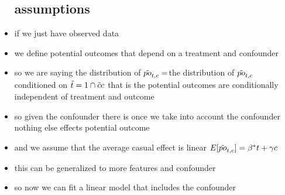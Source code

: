 \documentclass{article}
\begin{document}
\begin{itemize}
\subsection*{assumptions}
\item if we just have observed data 
\item we define potential outcomes that depend on a treatment and confounder 
\item so we are saying the distribution of $\Tilde{po}_{t,c}=$the distribution of $\Tilde{po}_{t,c}$ conditioned on $\Tilde{t}=1 \cap \Tilde{c}c$ 
that is the potential outcomes are conditionally independent of treatment and outcome 
\item so given the confounder there is once we take into account the confounder nothing else effects potential outcome
\item and we assume that the average casual effect is linear $E[\Tilde{po}_{t,c}]=\beta^{*}t+\gamma c$
\item this can be generalized to more features and confounder
\item so now we can fit a linear model  that includes the confounder

\end{itemize}
\end{document}
